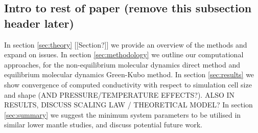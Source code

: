 \documentclass[%
preprint,                                  %
nofootinbib,
 amsmath,amssymb,
 aps,
]{revtex4-1}
\begin{document}










\subsection{\label{sec:intro.end}Intro to rest of paper (remove this subsection header later)}

In section \ref{sec:theory} [[Section?]] we provide an overview of the methods and expand on issues.
In section \ref{sec:methodology} we outline our computational approaches, for the non-equilibrium molecular dynamics direct method and equilibrium molecular dynamics Green-Kubo method. In section \ref{sec:results} we show convergence of computed conductivity with respect to simulation cell size and shape (AND PRESSURE/TEMPERATURE EFFECTS?). ALSO IN RESULTS, DISCUSS SCALING LAW / THEORETICAL MODEL?
In section \ref{sec:summary} we suggest the minimum system parameters to be utilised in similar lower mantle studies, and discuss potential future work. 
\end{document}
